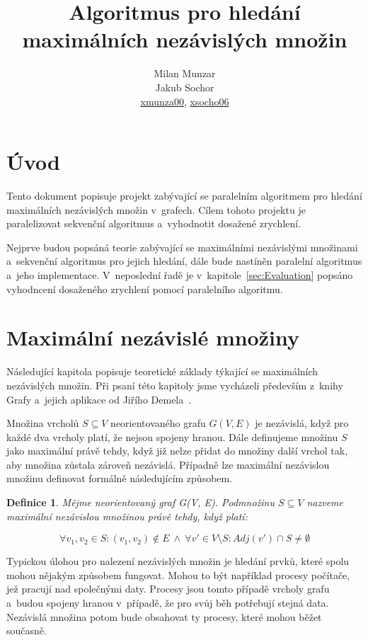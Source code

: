 \documentclass[12pt]{article}
\title{Algoritmus pro hledání maximálních nezávislých množin}
\author{Milan Munzar\\
Jakub Sochor\\
\normalsize{\url{xmunza00}, \url{xsocho06} }}
\date{}
\newtheorem{definition}{Definice}
\begin{document}
\maketitle

\section{Úvod}
Tento dokument popisuje projekt zabývající se paralelním algoritmem pro hledání maximálních nezávislých množin v~grafech. Cílem tohoto projektu je paralelizovat sekvenční algoritmus a~vyhodnotit dosažené zrychlení.

Nejprve budou popsáná teorie zabývající se maximálními nezávislými množinami a~sekvenční algoritmus pro jejich hledání, dále bude nastíněn paralelní algoritmus a~jeho implementace. V~neposlední řadě je v~kapitole~\ref{sec:Evaluation} popsáno vyhodncení dosaženého zrychlení pomocí paralelního algoritmu.



\section{Maximální nezávislé množiny}

Následující kapitola popisuje teoretické základy týkající se maximálních nezávislých množin. Při psaní této kapitoly jsme vycházeli především z~knihy Grafy a~jejich aplikace od Jiřího Demela~\cite{demel}.

Množina vrcholů $S \subseteq V$ neorientovaného grafu $G(V,E)$ je nezávislá, když pro každé dva vrcholy platí, že nejsou spojeny hranou. Dále definujeme množinu $S$ jako maximální právě tehdy, když již nelze přidat do množiny další vrchol tak, aby množina zůstala zároveň nezávislá. Případně lze maximální nezávislou množinu definovat formálně následujícím způsobem.

\begin{definition}
Mějme neorientovaný graf G(V, E). Podmnožinu $S \subseteq V$ nazveme maximální nezávislou množinou právě tehdy, když platí:

\begin{equation*}
\forall v_1, v_2 \in S: (v_1, v_2) \notin E\ \wedge\ \forall v' \in V \setminus S: Adj(v') \cap S \neq \emptyset
\end{equation*}



\end{definition}


Typickou úlohou pro nalezení nezávislých množin je hledání prvků, které spolu mohou nějakým způsobem fungovat. Mohou to být například procesy počítače, jež pracují nad společnými daty. Procesy jsou tomto případě vrcholy grafu a~budou spojeny hranou v~případě, že pro svůj běh potřebují stejná data. Nezávislá množina potom bude obsahovat ty procesy, které mohou běžet současně.
\end{document}
